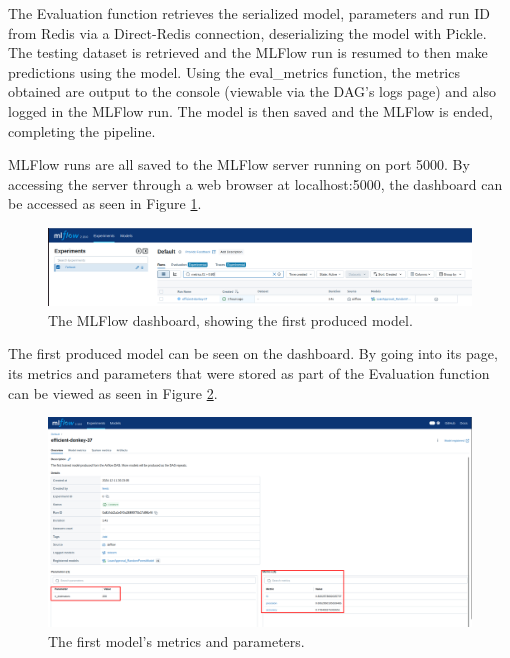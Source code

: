 \documentclass[12pt]{report}
\newcommand{\para}{\vspace{7pt}\noindent}
\begin{document}
\para The Evaluation function retrieves the serialized model, parameters and run ID from Redis 
via a Direct-Redis connection, deserializing the model with Pickle. The testing dataset is 
retrieved and the MLFlow run is resumed to then make predictions using the model. Using the 
eval\_metrics function, the metrics obtained are output to the console (viewable via the DAG's logs page)
and also logged in the MLFlow run. The model is then saved and the MLFlow is ended, completing the pipeline.

\para MLFlow runs are all saved to the MLFlow server running on port 5000. By accessing the server through 
a web browser at localhost:5000, the dashboard can be accessed as seen in Figure \ref{fig:MLFlowDash}.

\begin{figure}[H]
    \centering
    \includegraphics[width=\linewidth]{Implementation/MLFlow/Other/1.png}
    \caption{The MLFlow dashboard, showing the first produced model.}
    \label{fig:MLFlowDash}
\end{figure}

\para The first produced model can be seen on the dashboard. By going into its page, its metrics and 
parameters that were stored as part of the Evaluation function can be viewed as seen in Figure \ref{fig:MLFlowModel}.

\begin{figure}[H]
    \centering
    \includegraphics[width=\linewidth]{Implementation/MLFlow/Other/2.png}
    \caption{The first model's metrics and parameters.}
    \label{fig:MLFlowModel}
\end{figure}
\end{document}

